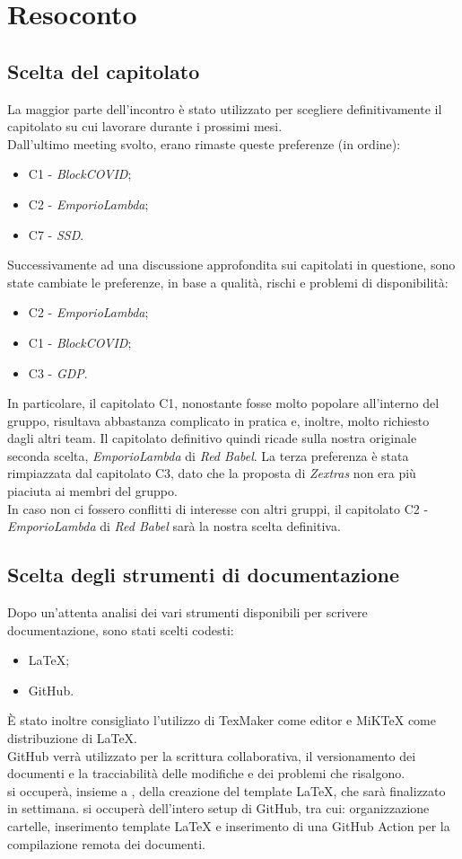 \section{Resoconto}
\subsection{Scelta del capitolato}
La maggior parte dell'incontro è stato utilizzato per scegliere definitivamente il capitolato su cui lavorare durante i prossimi mesi.\\
Dall'ultimo meeting svolto, erano rimaste queste preferenze (in ordine):
\begin{itemize}
\item C1 - \textit{BlockCOVID};
\item C2 - \textit{EmporioLambda};
\item C7 - \textit{SSD}.
\end{itemize}
Successivamente ad una discussione approfondita sui capitolati in questione, sono state cambiate le preferenze, in base a qualità, rischi e problemi di disponibilità:
\begin{itemize}
\item C2 - \textit{EmporioLambda};
\item C1 - \textit{BlockCOVID};
\item C3 - \textit{GDP}.
\end{itemize}
In particolare, il capitolato C1, nonostante fosse molto popolare all'interno del gruppo, risultava abbastanza complicato in pratica e, inoltre, molto richiesto dagli altri team. Il capitolato definitivo quindi ricade sulla nostra originale seconda scelta, \textit{EmporioLambda} di \textit{Red Babel}. La terza preferenza è stata rimpiazzata dal capitolato C3, dato che la proposta di \textit{Zextras} non era più piaciuta ai membri del gruppo.\\
In caso non ci fossero conflitti di interesse con altri gruppi, il capitolato C2 - \textit{EmporioLambda} di \textit{Red Babel} sarà la nostra scelta definitiva.
\subsection{Scelta degli strumenti di documentazione}
Dopo un'attenta analisi dei vari strumenti disponibili per scrivere documentazione, sono stati scelti codesti:
\begin{itemize}
\item \LaTeX {};
\item GitHub.
\end{itemize}
È stato inoltre consigliato l'utilizzo di TexMaker come editor e MiKTeX come distribuzione di \LaTeX {}.\\
GitHub verrà utilizzato per la scrittura collaborativa, il versionamento dei documenti e la tracciabilità delle modifiche e dei problemi che risalgono.\\
\SB{} si occuperà, insieme a \NM{}, della creazione del template \LaTeX {}, che sarà finalizzato in settimana.
\NM{} si occuperà dell'intero setup di GitHub, tra cui: organizzazione cartelle, inserimento template \LaTeX{} e inserimento di una GitHub Action per la compilazione remota dei documenti.
